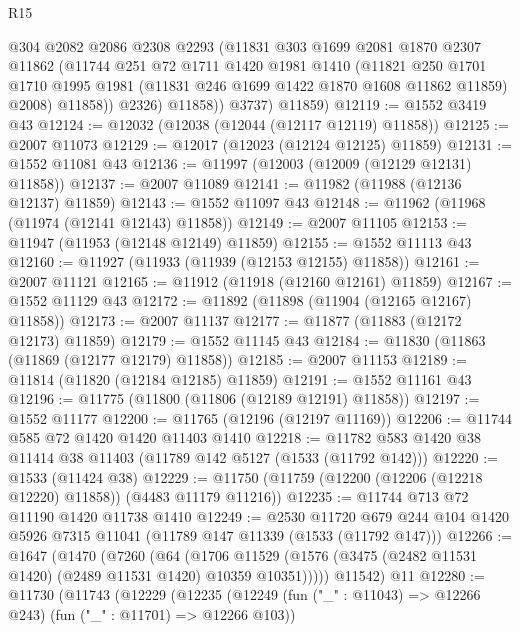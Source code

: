 \begin{lexlean}{R15}
\begin{coremodule}
              @304
              @2082
              @2086
              @2308
              @2293
              (@11831
                @303
                @1699
                @2081
                @1870
                @2307
                @11862
                (@11744
                  @251
                  @72
                  @1711
                  @1420
                  @1981
                  @1410
                  (@11821
                    @250
                    @1701
                    @1710
                    @1995
                    @1981
                    (@11831 @246 @1699 @1422 @1870 @1608 @11862 @11859)
                    @2008)
                  @11858))
              @2326)
            @11858))
        @3737)
      @11859)
@12119 := @1552 @3419 @43
@12124 := @12032 (@12038 (@12044 (@12117 @12119) @11858))
@12125 := @2007 @11073
@12129 := @12017 (@12023 (@12124 @12125) @11859)
@12131 := @1552 @11081 @43
@12136 := @11997 (@12003 (@12009 (@12129 @12131) @11858))
@12137 := @2007 @11089
@12141 := @11982 (@11988 (@12136 @12137) @11859)
@12143 := @1552 @11097 @43
@12148 := @11962 (@11968 (@11974 (@12141 @12143) @11858))
@12149 := @2007 @11105
@12153 := @11947 (@11953 (@12148 @12149) @11859)
@12155 := @1552 @11113 @43
@12160 := @11927 (@11933 (@11939 (@12153 @12155) @11858))
@12161 := @2007 @11121
@12165 := @11912 (@11918 (@12160 @12161) @11859)
@12167 := @1552 @11129 @43
@12172 := @11892 (@11898 (@11904 (@12165 @12167) @11858))
@12173 := @2007 @11137
@12177 := @11877 (@11883 (@12172 @12173) @11859)
@12179 := @1552 @11145 @43
@12184 := @11830 (@11863 (@11869 (@12177 @12179) @11858))
@12185 := @2007 @11153
@12189 := @11814 (@11820 (@12184 @12185) @11859)
@12191 := @1552 @11161 @43
@12196 := @11775 (@11800 (@11806 (@12189 @12191) @11858))
@12197 := @1552 @11177
@12200 := @11765 (@12196 (@12197 @11169))
@12206 := @11744 @585 @72 @1420 @1420 @11403 @1410
@12218 := @11782 @583 @1420 @38 @11414 @38 @11403 (@11789 @142 @5127 (@1533 (@11792 @142)))
@12220 := @1533 (@11424 @38)
@12229 := @11750 (@11759 (@12200 (@12206 (@12218 @12220) @11858)) (@4483 @11179 @11216))
@12235 := @11744 @713 @72 @11190 @1420 @11738 @1410
@12249 := @2530
    @11720
    @679
    @244
    @104
    @1420
    @5926
    @7315
    @11041
    (@11789 @147 @11339 (@1533 (@11792 @147)))
@12266 := @1647
    (@1470
      (@7260
        (@64
          (@1706 @11529 (@1576 (@3475 (@2482 @11531 @1420) (@2489 @11531 @1420) @10359 @10351)))))
      @11542)
    @11
@12280 := @11730
    (@11743
      (@12229
        (@12235
          (@12249 (fun ("_" : @11043) => @12266 @243) (fun ("_" : @11701) => @12266 @103))

\end{coremodule}
\end{lexlean}
